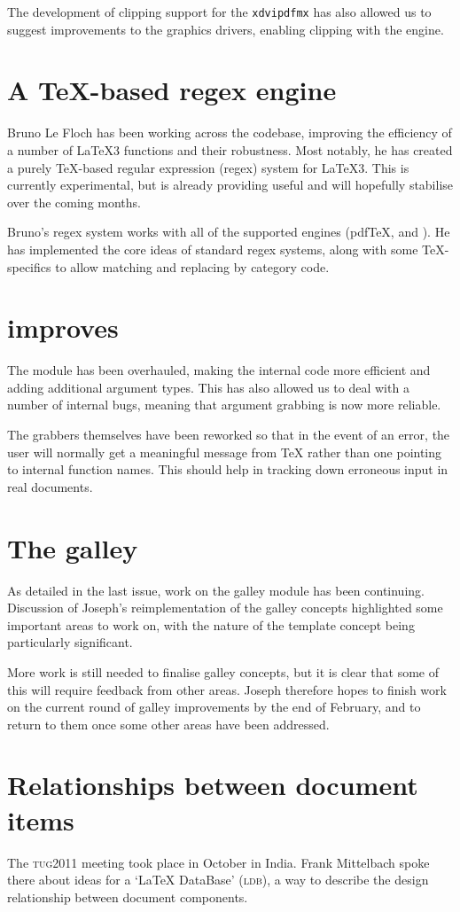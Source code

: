\documentclass{ltnews}
\begin{document}
The development of clipping support for the \texttt{xdvipdfmx} has also allowed
us to suggest improvements to the \LaTeXe{} graphics drivers, enabling clipping
with the \XeTeX{} engine.

\section{A TeX-based regex engine}

Bruno Le Floch has been working across the codebase, improving the efficiency
of a number of \LaTeX3 functions and their robustness. Most notably, he has
created a purely \TeX{}-based regular expression (regex) system for \LaTeX3.
This is currently experimental, but is already providing useful and will
hopefully stabilise over the coming months.

Bruno's regex system works with all of the supported engines (pdf\TeX{},
\XeTeX{} and \LuaTeX{}). He has implemented the core ideas of standard
regex systems, along with some \TeX{}-specifics to allow matching and
replacing by category code.

\section{ improves}

The  module has been overhauled, making the internal code
more efficient and adding additional argument types. This has also allowed
us to deal with a number of internal bugs, meaning that argument grabbing
is now more reliable.

The grabbers themselves have been reworked so that in the event of an error,
the user will normally get a meaningful message from \TeX{} rather than
one pointing to  internal function names. This should help
in tracking down erroneous input in real documents.

\section{The galley}

As detailed in the last issue, work on the galley module has been continuing.
Discussion of Joseph's reimplementation of the galley concepts highlighted
some important areas to work on, with the nature of the template concept
being particularly significant.

More work is still needed to finalise galley concepts, but it is clear that
some of this will require feedback from other areas. Joseph therefore hopes
to finish work on the current round of galley improvements by the end of
February, and to return to them once some other areas have been addressed.

\section{Relationships between document items}

The \textsc{tug}2011 meeting took place in October in India. Frank Mittelbach
spoke there about ideas for a `\LaTeX{} DataBase' (\textsc{ldb}), a way to
describe the design relationship between document components.
\end{document}
